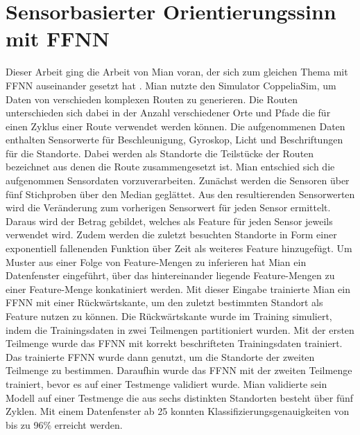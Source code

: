 \section{Sensorbasierter Orientierungssinn mit FFNN}
Dieser Arbeit ging die Arbeit von Mian voran, der sich zum gleichen Thema mit FFNN auseinander gesetzt hat \cite{naveedThesis}.
Mian nutzte den Simulator CoppeliaSim, um Daten von verschieden komplexen Routen zu generieren.
Die Routen unterschieden sich dabei in der Anzahl verschiedener Orte und Pfade die für einen Zyklus einer Route verwendet werden können.
Die aufgenommenen Daten enthalten Sensorwerte für Beschleunigung, Gyroskop, Licht und Beschriftungen für die Standorte.
Dabei werden als Standorte die Teilstücke der Routen bezeichnet aus denen die Route zusammengesetzt ist.
\newline
\newline
Mian entschied sich die aufgenommen Sensordaten vorzuverarbeiten.
Zunächst werden die Sensoren über fünf Stichproben über den Median geglättet.
Aus den resultierenden Sensorwerten wird die Veränderung zum vorherigen Sensorwert für jeden Sensor ermittelt.
Daraus wird der Betrag gebildet, welches als Feature für jeden Sensor jeweils verwendet wird.
Zudem werden die zuletzt besuchten Standorte in Form einer exponentiell fallenenden Funktion über Zeit als weiteres Feature hinzugefügt.
Um Muster aus einer Folge von Feature-Mengen zu inferieren hat Mian ein Datenfenster eingeführt, über das
hintereinander liegende Feature-Mengen zu einer Feature-Menge konkatiniert werden.
\newline
\newline
Mit dieser Eingabe trainierte Mian ein FFNN mit einer Rückwärtskante, um den zuletzt bestimmten Standort als Feature nutzen zu können.
Die Rückwärtskante wurde im Training simuliert, indem die Trainingsdaten in zwei Teilmengen partitioniert wurden.
Mit der ersten Teilmenge wurde das FFNN mit korrekt beschrifteten Trainingsdaten trainiert.
Das trainierte FFNN wurde dann genutzt, um die Standorte der zweiten Teilmenge zu bestimmen.
Daraufhin wurde das FFNN mit der zweiten Teilmenge trainiert, bevor es auf einer Testmenge validiert wurde.
\newline
\newline
Mian validierte sein Modell auf einer Testmenge die aus sechs distinkten Standorten besteht über fünf Zyklen.
Mit einem Datenfenster ab 25 konnten Klassifizierungsgenauigkeiten von bis zu 96\% erreicht werden.
